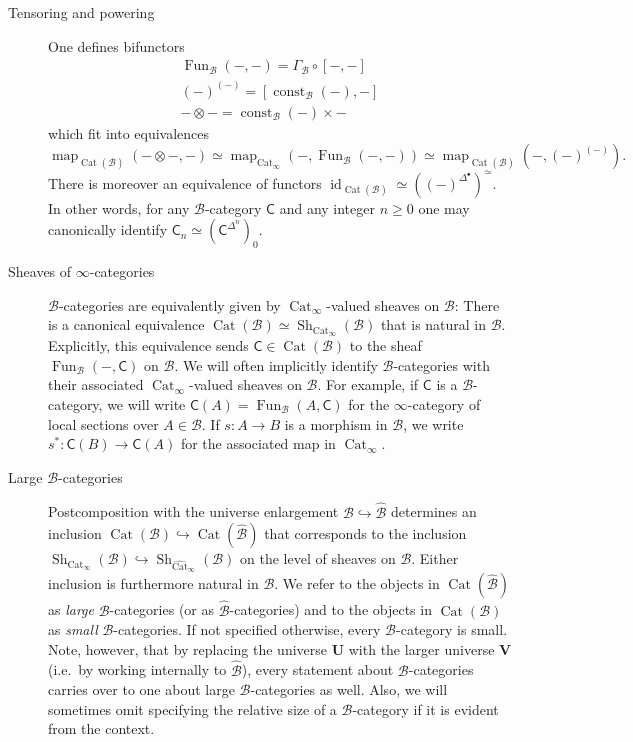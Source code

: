 \documentclass[reqno]{amsart}
\numberwithin{equation}{subsection}
\theoremstyle{plain}
\theoremstyle{definition}
\let\scr=\mathcal
\let\into=\hookrightarrow
\def\BB{\scr B}
\def\BBB{\widehat{\BB}}
\def\bU{\mathbf{U}}
\def\bV{\mathbf{V}}
\DeclareMathOperator{\id}{id}
\DeclareMathOperator{\Cat}{Cat}
\DeclareMathOperator{\Shv}{Sh}
\DeclareMathOperator{\Fun}{Fun}
\DeclareMathOperator{\Map}{map}
\DeclareMathOperator{\const}{const}
\newcommand{\map}[1]{\Map_{#1}}
\newcommand{\I}[1]{\mathsf{#1}}
\newcommand{\iFun}[2]{{[#1,#2]}}
\newcommand{\CatS}{\Cat_{\infty}}
\newcommand{\CatSS}{\widehat{\Cat}_\infty}
\begin{document}
\begin{description}
    \item[Tensoring and powering] One defines bifunctors
    \begin{align}
        \Fun_{\BB}(-,-)=\Gamma_{\BB}\circ\iFun{-}{-} \tag{Functor $\infty$-category} \\
        (-)^{(-)}=\iFun{\const_{\BB}(-)}{-} \tag{Powering}\\
        -\otimes - = \const_{\BB}(-)\times - \tag{Tensoring}
    \end{align}
    which fit into equivalences
    \begin{equation*}
        \map{\Cat(\BB)}(-\otimes -, -)\simeq \map{\CatS}(-,\Fun_{\BB}(-,-))\simeq\map{\Cat(\BB)}(-, (-)^{(-)}).
    \end{equation*}
    There is moreover an equivalence of functors $\id_{\Cat(\BB)}\simeq ((-)^{\Delta^\bullet})^\simeq$. In other words, for any $\BB$-category $\I{C}$ and any integer $n\geq 0$ one may canonically identify $\I{C}_n\simeq (\I{C}^{\Delta^n})_0$.
    
    \item[Sheaves of $\infty$-categories] $\BB$-categories are equivalently given by $\CatS$-valued sheaves on $\BB$: There is a canonical equivalence $\Cat(\BB)\simeq \Shv_{\CatS}(\BB)$ that is natural in $\BB$. Explicitly, this equivalence sends $\I{C}\in\Cat(\BB)$ to the sheaf $\Fun_{\BB}(-,\I{C})$ on $\BB$. We will often implicitly identify $\BB$-categories with their associated $\CatS$-valued sheaves on $\BB$. For example, if $\I{C}$ is a $\BB$-category, we will write $\I{C}(A)=\Fun_{\BB}(A,\I{C})$ for the $\infty$-category of local sections over $A\in\BB$. If $s \colon A \rightarrow B$ is a morphism in $\BB$, we write $s^\ast\colon \I{C}(B)\to\I{C}(A)$ for the associated map in $\CatS$.
    
    \item[Large $\BB$-categories] Postcomposition with the universe enlargement $\BB\into\BBB$ determines an inclusion $\Cat(\BB)\into\Cat(\BBB)$ that corresponds to the inclusion $\Shv_{\CatS}(\BB)\into\Shv_{\CatSS}(\BB)$ on the level of sheaves on $\BB$. Either inclusion is furthermore natural in $\BB$. We refer to the objects in $\Cat(\BBB)$ as \emph{large} $\BB$-categories (or as $\BBB$-categories) and to the objects in $\Cat(\BB)$ as \emph{small} $\BB$-categories. If not specified otherwise, every $\BB$-category is small. Note, however, that by replacing the universe $\bU$ with the larger universe $\bV$ (i.e.\ by working internally to $\BBB$), every statement about $\BB$-categories carries over to one about large $\BB$-categories as well. Also, we will sometimes omit specifying the relative size of a $\BB$-category if it is evident from the context.
    

\end{description}
\end{document}
